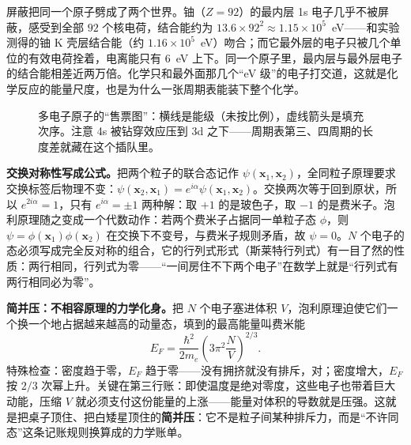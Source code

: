 屏蔽把同一个原子劈成了两个世界。铀（\(Z=92\)）的最内层 1s 电子几乎不被屏蔽，感受到全部 \(92\) 个核电荷，结合能约为 \(13.6\times92^2\approx1.15\times10^5\)~eV——和实验测得的铀 K 壳层结合能（约 \(1.16\times10^5\)~eV）吻合；而它最外层的电子只被几个单位的有效电荷拴着，电离能只有 \(6\)~eV 上下。同一个原子里，最内层与最外层电子的结合能相差近两万倍。化学只和最外面那几个“eV 级”的电子打交道，这就是化学反应的能量尺度，也是为什么一张周期表能装下整个化学。

\begin{figure}[htbp]
\centering
{}
\caption{多电子原子的“售票图”：横线是能级（未按比例），虚线箭头是填充次序。注意 4s 被钻穿效应压到 3d 之下——周期表第三、四周期的长度差就藏在这个插队里。}
\end{figure}

\begin{mathbridge}
\textbf{交换对称性写成公式。}把两个粒子的联合态记作 \(\psi(\mathbf x_1,\mathbf x_2)\)，全同粒子原理要求交换标签后物理不变：\(\psi(\mathbf x_2,\mathbf x_1)=e^{i\alpha}\psi(\mathbf x_1,\mathbf x_2)\)。交换两次等于回到原状，所以 \(e^{2i\alpha}=1\)，只有 \(e^{i\alpha}=\pm1\) 两种解：取 \(+1\) 的是玻色子，取 \(-1\) 的是费米子。泡利原理随之变成一个代数动作：若两个费米子占据同一单粒子态 \(\phi\)，则 \(\psi=\phi(\mathbf x_1)\phi(\mathbf x_2)\) 在交换下不变号，与费米子规则矛盾，故 \(\psi=0\)。\(N\) 个电子的态必须写成完全反对称的组合，它的行列式形式（斯莱特行列式）有一目了然的性质：两行相同，行列式为零——“一间房住不下两个电子”在数学上就是“行列式有两行相同必为零”。

\textbf{简并压：不相容原理的力学化身。}把 \(N\) 个电子塞进体积 \(V\)，泡利原理迫使它们一个换一个地占据越来越高的动量态，填到的最高能量叫费米能
\[
E_F=\frac{\hbar^2}{2m_e}\left(3\pi^2\frac{N}{V}\right)^{2/3}.
\]
特殊检查：密度趋于零，\(E_F\) 趋于零——没有拥挤就没有排斥，对；密度增大，\(E_F\) 按 \(2/3\) 次幂上升。关键在第三行账：即使温度是绝对零度，这些电子也带着巨大动能，压缩 \(V\) 就必须支付这份能量的上涨——能量对体积的导数就是压强。这就是把桌子顶住、把白矮星顶住的\textbf{简并压}：它不是粒子间某种排斥力，而是“不许同态”这条记账规则换算成的力学账单。
\end{mathbridge}


